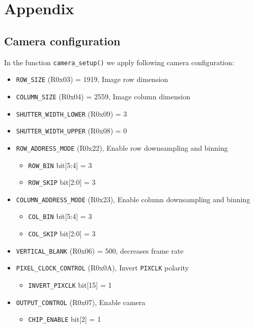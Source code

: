 \documentclass{article}
\begin{document}
\newpage
\section{Appendix}

\subsection{Camera configuration}
In the function \verb'camera_setup()' we apply following camera configuration:
\begin{itemize}
\item \verb'ROW_SIZE' (R0x03) = 1919, Image row dimension
\item \verb'COLUMN_SIZE' (R0x04) = 2559, Image column dimension
\item \verb'SHUTTER_WIDTH_LOWER' (R0x09) = 3
\item \verb'SHUTTER_WIDTH_UPPER' (R0x08) = 0
\item \verb'ROW_ADDRESS_MODE' (R0x22), Enable row downsampling and binning
    \begin{itemize}
    \item \verb'ROW_BIN' bit[5:4] = 3
    \item \verb'ROW_SKIP' bit[2:0] = 3
    \end{itemize}
\item \verb'COLUMN_ADDRESS_MODE' (R0x23), Enable column downsampling and binning
    \begin{itemize}
    \item \verb'COL_BIN' bit[5:4] = 3
    \item \verb'COL_SKIP' bit[2:0] = 3
    \end{itemize}
\item \verb'VERTICAL_BLANK' (R0x06) = 500, decreases frame rate
\item \verb'PIXEL_CLOCK_CONTROL' (R0x0A), Invert \verb'PIXCLK' polarity
    \begin{itemize}
    \item \verb'INVERT_PIXCLK' bit[15] = 1
    \end{itemize}
\item \verb'OUTPUT_CONTROL' (R0x07), Enable camera
    \begin{itemize}
    \item \verb'CHIP_ENABLE' bit[2] = 1
    \end{itemize}
\end{itemize}
\end{document}
